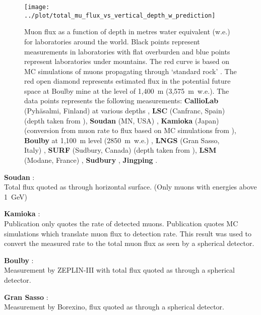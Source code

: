 \documentclass{article}
\begin{document}
\begin{figure}[ht]
  \centering
  \texttt{[image: ../plot/total\_mu\_flux\_vs\_vertical\_depth\_w\_prediction]}
  \caption{
Muon flux as a function of depth in metres water equivalent (w.e.) for
laboratories around the world. Black points represent measurements in
laboratories with flat overburden and blue points represent
laboratories under mountains. The red curve is based on MC simulations
of muons propagating through `standard rock'
\cite{Kudryavtsev:2008qh}. The red open diamond represents estimated
flux in the potential future space at Boulby mine at the level of
1,400~m (3,575~{m~w.e.}). The data points represents the
following measurements:
%
\textbf{CallioLab} (Pyh\"{a}salmi, Finland) at various depths
\cite{ENQVIST2005286},
\textbf{LSC} (Canfranc, Spain) \cite{Trzaska2019} (depth taken from
\cite{Canfranc2005}), \textbf{Soudan} (MN, USA)
\cite{PhysRevD.90.122003},
\textbf{Kamioka} (Japan) \cite{PhysRevD.93.012004} (conversion from
muon rate to flux based on MC simulations from
\cite{PhysRevD.74.053007}),
\textbf{Boulby} at 1,100~m level (2850~m~w.e.) \cite{REICHHART201367},
\textbf{LNGS} (Gran Sasso, Italy) \cite{Agostini.2019},
\textbf{SURF} (Sudbury, Canada) \cite{ABGRALL201770} (depth taken from
\cite{PhysRevD.27.1444}),
\textbf{LSM} (Modane, France) \cite{PhysRevD.40.2163},
\textbf{Sudbury} \cite{PhysRevD.80.012001},
\textbf{Jingping} \cite{Guo.2021}.
}
\label{fig:flux_depth_prediction}
\end{figure}



\textbf{Soudan} \cite{PhysRevD.90.122003}:\\
Total flux quoted as through horizontal surface. (Only muons with
energies above 1~GeV)

\textbf{Kamioka} \cite{PhysRevD.93.012004,PhysRevD.74.053007}:\\
Publication \cite{PhysRevD.93.012004} only quotes the rate of detected
muons. Publication \cite{PhysRevD.74.053007} quotes MC simulations
which translate muon flux to detection rate. This result was used to
convert the measured rate to the total muon flux as seen by a spherical
detector.

\textbf{Boulby} \cite{REICHHART201367}:\\
Measurement by ZEPLIN-III with total flux quoted as through a spherical detector.

\textbf{Gran Sasso} \cite{Agostini.2019}:\\
Measurement by Borexino, flux quoted as through a spherical detector.
\end{document}
